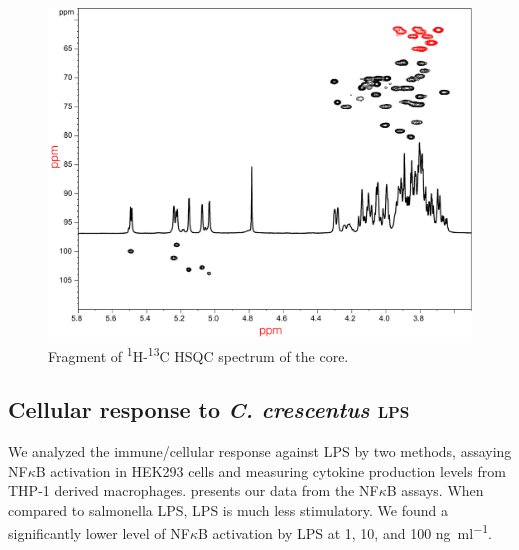 \begin{figure}[htb]
  \begin{center}
    \includegraphics[width=\textwidth]{lps_chapter/img/lpsfig4.pdf}
  \end{center}
  \caption{Fragment of \textsuperscript{1}H-\textsuperscript{13}C \ac{HSQC} spectrum of the core.}
  \label{fig:lpscorenmr}	
\end{figure}

\subsection{Cellular response to \textit{C. crescentus} \textsc{lps}}\label{sec:cell-resp-text}
We analyzed the immune/cellular response against \caulobacter{} \ac{LPS} by two methods, assaying NF$\kappa$B activation in HEK293 cells and measuring cytokine production levels from THP-1 derived macrophages.  presents our data from the NF$\kappa$B assays. When compared to \ac{salmonella} \ac{LPS}, \caulobacter{} \ac{LPS} is much less stimulatory. We found a significantly lower level of NF$\kappa$B activation by \caulobacter{} \ac{LPS} at 1, 10, and 100 \si{\nano\gram\per\milli\litre}.

